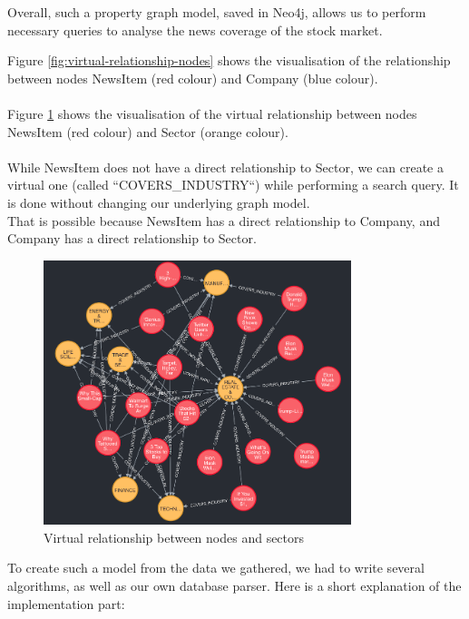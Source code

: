 \noindent Overall, such a property graph model, saved in Neo4j, allows us to perform necessary queries to analyse the news coverage of the stock market.

\noindent Figure \ref{fig:virtual-relationship-nodes} shows the visualisation of the relationship between nodes NewsItem (red colour) and Company (blue colour).\\
\\
\noindent Figure \ref{fig:virtual-relationship-nodes-sectors} shows the visualisation of the virtual relationship between nodes NewsItem (red colour) and Sector (orange colour). \\
\\
While NewsItem does not have a direct relationship to Sector, we can create a virtual one (called ``COVERS\_INDUSTRY``) while performing a search query. It is done without changing our underlying graph model. 
\\
That is possible because NewsItem has a direct relationship to Company, and Company has a direct relationship to Sector.

\begin{figure}[h]
 \centering
 \includegraphics[width=0.8\textwidth]{images/virtual-relationship-between-nodes-sectors.png}
 \caption{Virtual relationship between nodes and sectors }
 \label{fig:virtual-relationship-nodes-sectors}
\end{figure}

\newpage

\noindent To create such a model from the data we gathered, we had to write several algorithms, as well as our own database parser. Here is a short explanation of the implementation part:

